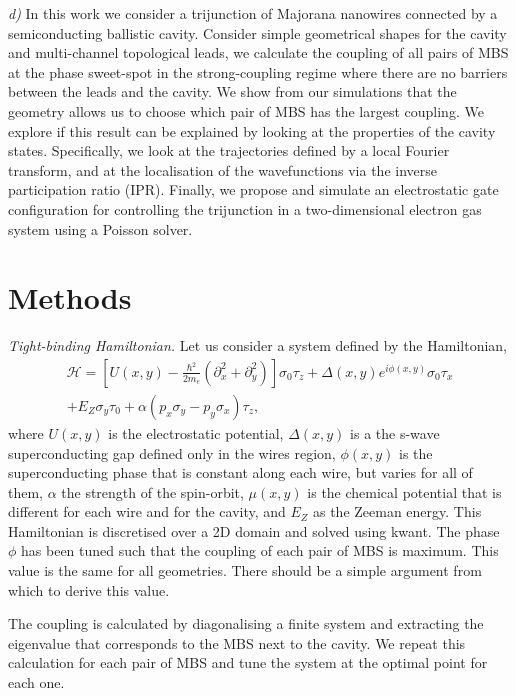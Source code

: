 \documentclass[10pt,twocolumn,aps,superscriptaddress, floatfix,notitlepage]{revtex4-1}
\begin{document}
\textit{d) } In this work we consider a trijunction of Majorana nanowires connected by a semiconducting ballistic cavity. Consider simple geometrical shapes for the cavity and multi-channel topological leads, we calculate the coupling of all pairs of MBS at the phase sweet-spot in the strong-coupling regime where there are no barriers between the leads and the cavity. We show from our simulations that the geometry allows us to choose which pair of MBS has the largest coupling. We explore if this result can be explained by looking at the properties of the cavity states. {\color{red} Specifically, we look at the trajectories defined by a local Fourier transform, and at the localisation of the wavefunctions via the inverse participation ratio (IPR)}. Finally, we propose and simulate an electrostatic gate configuration for controlling the trijunction in a two-dimensional electron gas system using a Poisson solver.

\section{Methods}

\textit{Tight-binding Hamiltonian.} Let us consider a system defined by the Hamiltonian,
\begin{multline}
\mathcal H = \left[ U(x,y) - \frac{\hbar^2}{2m_e} (\partial_x^2 + \partial_y^2)  \right] \sigma_0 \tau_z + \Delta (x,y) e^{i \phi(x, y)} \sigma_0 \tau_x \\ + E_Z  \sigma_y \tau_0 + \alpha( p_x \sigma_y - p_y \sigma_x)\tau_z,
\end{multline}
where $U(x,y)$ is the electrostatic potential, $\Delta(x,y)$ is a the s-wave superconducting gap defined only in the wires region, $\phi(x,y)$ is the superconducting phase that is constant along each wire, but varies for all of them, $\alpha$ the strength of the spin-orbit, $\mu(x,y)$ is the chemical potential that is different for each wire and for the cavity, and $E_Z$ as the Zeeman energy. This Hamiltonian is discretised over a 2D domain and solved using kwant. The phase $\phi$ has been tuned such that the coupling of each pair of MBS is maximum. {\color{red}This value is the same for all geometries. There should be a simple argument from which to derive this value.}

The coupling is calculated by diagonalising a finite system and extracting the eigenvalue that corresponds to the MBS next to the cavity. We repeat this calculation for each pair of MBS and tune the system at the optimal point for each one.
\end{document}
